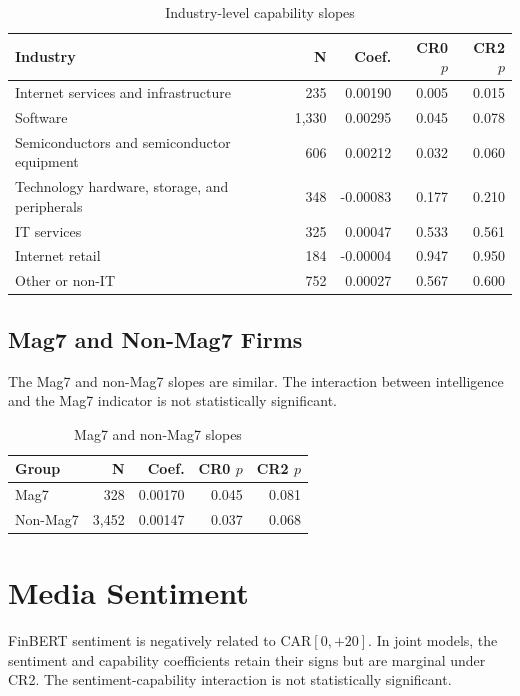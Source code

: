 \documentclass[12pt]{article}
\begin{document}
\begin{table}[htbp]
\centering
\caption{Industry-level capability slopes}
\label{tab:a_industry}
\begin{tabular}{lrrrr}
\toprule
Industry & N & Coef. & CR0 $p$ & CR2 $p$ \\
\midrule
Internet services and infrastructure & 235 & 0.00190 & 0.005 & 0.015 \\
Software & 1,330 & 0.00295 & 0.045 & 0.078 \\
Semiconductors and semiconductor equipment & 606 & 0.00212 & 0.032 & 0.060 \\
Technology hardware, storage, and peripherals & 348 & -0.00083 & 0.177 & 0.210 \\
IT services & 325 & 0.00047 & 0.533 & 0.561 \\
Internet retail & 184 & -0.00004 & 0.947 & 0.950 \\
Other or non-IT & 752 & 0.00027 & 0.567 & 0.600 \\
\bottomrule
\end{tabular}
\end{table}

\subsection{Mag7 and Non-Mag7 Firms}

The Mag7 and non-Mag7 slopes are similar. The interaction between intelligence
and the Mag7 indicator is not statistically significant.

\begin{table}[htbp]
\centering
\caption{Mag7 and non-Mag7 slopes}
\label{tab:a_mag7}
\begin{tabular}{lrrrr}
\toprule
Group & N & Coef. & CR0 $p$ & CR2 $p$ \\
\midrule
Mag7 & 328 & 0.00170 & 0.045 & 0.081 \\
Non-Mag7 & 3,452 & 0.00147 & 0.037 & 0.068 \\
\bottomrule
\end{tabular}
\end{table}

\section{Media Sentiment}
\label{app:sentiment}

FinBERT sentiment is negatively related to CAR$[0,{+}20]$. In joint models, the
sentiment and capability coefficients retain their signs but are marginal under
CR2. The sentiment-capability interaction is not statistically significant.
\end{document}
